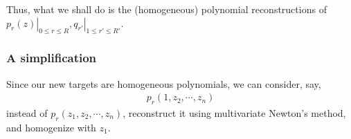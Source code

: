 \documentclass[11pt]{book}
\begin{document}
Thus, what we shall do is the (homogeneous) polynomial reconstructions of $\left. p_r(z) \right|_{0 \leq r \leq R}, \left. q_{r'} \right|_{1 \leq r' \leq R'}$.

\subsubsection{A simplification}
Since our new targets are homogeneous polynomials, we can consider, say,
\begin{eqnarray}
p_r(1, z_2, \cdots, z_n)
\end{eqnarray}
instead of $p_r(z_1, z_2, \cdots, z_n)$, reconstruct it using multivariate Newton's method, and homogenize with $z_1$.
\end{document}
